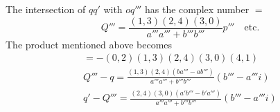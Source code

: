 
The intersection of $qq'$ with $oq'''$ has the complex number $=$
\[
Q'''=\frac{(1,3)(2,4)(3,0)}{a'''a'''+b'''b'''}p''' \quad\text{etc.}
\]
The product mentioned above becomes
\[
\begin{gathered}  =-(0,2)(1,3)(2,4)(3,0)(4,1)\\[9pt] Q'''-q=\frac{(1,3)(2,4)(ba'''-ab''')}{a'''a'''+b'''b'''} (b'''-a'''i)\\[9pt] q'-Q'''=\frac{(2,4)(3,0)(a'b'''-b'a''')}{a'''a'''+b'''b'''} (b'''-a'''i) \end{gathered}
\]
\clearpage
\endgroup
